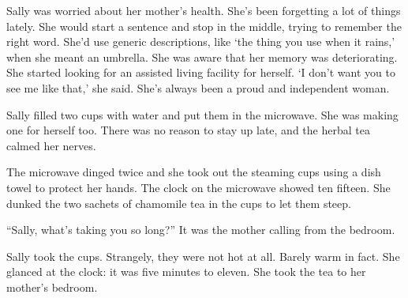 \documentclass[12pt]{book}
\begin{document}
Sally was worried about her mother's health. She's been forgetting a lot of things lately. She would start a sentence and stop in the middle, trying to remember the right word. She'd use generic descriptions, like `the thing you use when it rains,' when she meant an umbrella. She was aware that her memory was deteriorating. She started looking for an assisted living facility for herself. `I don't want you to see me like that,' she said. She's always been a proud and independent woman. 

Sally filled two cups with water and put them in the microwave. She was making one for herself too. There was no reason to stay up late, and the herbal tea calmed her nerves.

The microwave dinged twice and she took out the steaming cups using a dish towel to protect her hands. The clock on the microwave showed ten fifteen. She dunked the two sachets of chamomile tea in the cups to let them steep.

``Sally, what's taking you so long?'' It was the mother calling from the bedroom. 

Sally took the cups. Strangely, they were not hot at all. Barely warm in fact. She glanced at the clock: it was five minutes to eleven. She took the tea to her mother's bedroom.
\end{document}

